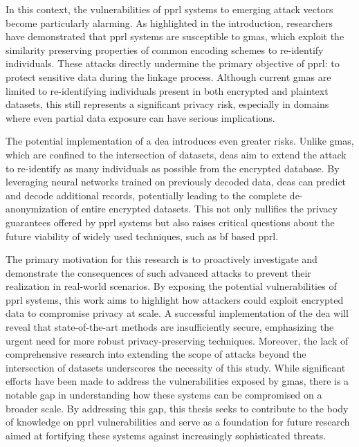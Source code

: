 In this context, the vulnerabilities of \ac{pprl} systems to emerging attack vectors become particularly alarming. 
As highlighted in the introduction, researchers have demonstrated that \ac{pprl} systems are susceptible to \ac{gma}s, which exploit the similarity preserving properties of common encoding schemes to re-identify individuals. 
These attacks directly undermine the primary objective of \ac{pprl}: to protect sensitive data during the linkage process. 
Although current \ac{gma}s are limited to re-identifying individuals present in both encrypted and plaintext datasets, this still represents a significant privacy risk, especially in domains where even partial data exposure can have serious implications.

The potential implementation of a \ac{dea} introduces even greater risks. 
Unlike \ac{gma}s, which are confined to the intersection of datasets, \ac{dea}s aim to extend the attack to re-identify as many individuals as possible from the encrypted database. 
By leveraging neural networks trained on previously decoded data, \ac{dea}s can predict and decode additional records, potentially leading to the complete de-anonymization of entire encrypted datasets. 
This not only nullifies the privacy guarantees offered by \ac{pprl} systems but also raises critical questions about the future viability of widely used techniques, such as \ac{bf} based \ac{pprl}.

The primary motivation for this research is to proactively investigate and demonstrate the consequences of such advanced attacks to prevent their realization in real-world scenarios.
By exposing the potential vulnerabilities of \ac{pprl} systems, this work aims to highlight how attackers could exploit encrypted data to compromise privacy at scale. 
A successful implementation of the \ac{dea} will reveal that state-of-the-art methods are insufficiently secure, emphasizing the urgent need for more robust privacy-preserving techniques.
Moreover, the lack of comprehensive research into extending the scope of attacks beyond the intersection of datasets underscores the necessity of this study. 
While significant efforts have been made to address the vulnerabilities exposed by \ac{gma}s, there is a notable gap in understanding how these systems can be compromised on a broader scale.
By addressing this gap, this thesis seeks to contribute to the body of knowledge on \ac{pprl} vulnerabilities and serve as a foundation for future research aimed at fortifying these systems against increasingly sophisticated threats.



